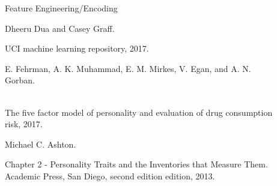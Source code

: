 \documentclass[6pt, final, xcolor=table]{beamer}
\newlength{\sepwidth}
\newlength{\colwidth}
\newcommand{\separatorcolumn}{\begin{column}{\sepwidth}\end{column}}
\begin{document}
\begin{frame}[t]
\begin{columns}[t]
\begin{column}{\colwidth}
\begin{block}{Feature Engineering/Encoding}
\begin{description}
    \small{\item [{[1]}] Dheeru Dua and Casey Graff.} \footnotesize{UCI machine learning repository, 2017.} 
    \small{\item [{[2]}] E. Fehrman, A. K. Muhammad, E. M. Mirkes, V. Egan, and A. N. Gorban.} \\
    \footnotesize{The five factor model of personality and evaluation of drug consumption risk, 2017.}
    \small{\item [{[3]}] Michael C. Ashton.} \footnotesize{Chapter 2 - Personality Traits and the Inventories that Measure Them. \\
    Academic Press, San Diego, second edition edition, 2013.}
\end{description}




  \end{block}







\end{column}

\separatorcolumn

\begin{column}{\colwidth}


\end{column}
\end{columns}
\end{frame}
\end{document}
